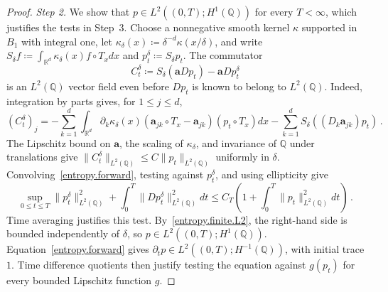\documentclass[11pt]{amsart}
\theoremstyle{definition}
\theoremstyle{remark}
\numberwithin{equation}{section}
\newcommand{\Q}{\mathbb Q}
\newcommand{\R}{\mathbb R}
\renewcommand{\a}{\mathbf a}
\begin{document}
\begin{proof}
\emph{Step 2.} We show that $p\in L^2((0,T);H^1(\Q))$ for every $T<\infty$, which justifies the tests in Step~3. Choose a nonnegative smooth kernel $\kappa$ supported in $B_1$ with integral one, let $\kappa_\delta(x)\coloneqq\delta^{-d}\kappa(x/\delta)$, and write $S_\delta f\coloneqq\int_{\R^d}\kappa_\delta(x)f\circ T_xdx$ and $p_t^\delta\coloneqq S_\delta p_t$. The commutator
\begin{equation*}
 C_t^\delta\coloneqq S_\delta(\a Dp_t)-\a Dp_t^\delta
\end{equation*}
is an $L^2(\Q)$ vector field even before $Dp_t$ is known to belong to $L^2(\Q)$. Indeed, integration by parts gives, for $1\leq j\leq d$,
\begin{equation*}
 (C_t^\delta)_j
 =-\sum_{k=1}^d\int_{\R^d}
 \partial_k\kappa_\delta(x)
 (\a_{jk}\circ T_x-\a_{jk})(p_t\circ T_x)dx
 -\sum_{k=1}^dS_\delta((D_k\a_{jk})p_t)\, .
\end{equation*}
The Lipschitz bound on $\a$, the scaling of $\kappa_\delta$, and invariance of $\Q$ under translations give $\|C_t^\delta\|_{L^2(\Q)}\leq C\|p_t\|_{L^2(\Q)}$ uniformly in $\delta$. Convolving~\eqref{entropy.forward}, testing against $p_t^\delta$, and using ellipticity give
\begin{equation*}
 \sup_{0\leq t\leq T}\|p_t^\delta\|_{L^2(\Q)}^2
 +\int_0^T\|Dp_t^\delta\|_{L^2(\Q)}^2dt
 \leq C_T\left(1+\int_0^T\|p_t\|_{L^2(\Q)}^2dt\right)\, .
\end{equation*}
Time averaging justifies this test. By~\eqref{entropy.finite.L2}, the right-hand side is bounded independently of $\delta$, so $p\in L^2((0,T);H^1(\Q))$. Equation~\eqref{entropy.forward} gives $\partial_tp\in L^2((0,T);H^{-1}(\Q))$, with initial trace $1$. Time difference quotients then justify testing the equation against $g(p_t)$ for every bounded Lipschitz function $g$.


\end{proof}
\end{document}
